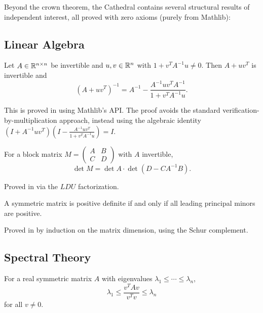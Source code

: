 \documentclass[11pt,a4paper]{article}
\begin{document}
Beyond the crown theorem, the Cathedral contains several structural
results of independent interest, all proved with zero axioms
(purely from Mathlib):

\subsection{Linear Algebra}

\begin{theorem}
\label{thm:sm}
Let $A \in \mathbb{R}^{n \times n}$ be invertible and $u, v \in \mathbb{R}^n$ with
$1 + v^T A^{-1} u \neq 0$. Then $A + uv^T$ is invertible and
\[
  (A + uv^T)^{-1} = A^{-1} - \frac{A^{-1}uv^TA^{-1}}{1 + v^TA^{-1}u}.
\]
\end{theorem}

This is proved in  using
Mathlib's  API. The proof avoids the standard
verification-by-multiplication approach, instead using the algebraic
identity $(I + A^{-1}uv^T)(I - \frac{A^{-1}uv^T}{1+v^TA^{-1}u}) = I$.

\begin{theorem}
\label{thm:schur}
For a block matrix $M = \begin{pmatrix} A & B \\ C & D \end{pmatrix}$
with $A$ invertible,
\[
  \det M = \det A \cdot \det(D - CA^{-1}B).
\]
\end{theorem}

Proved in  via the
$LDU$ factorization.

\begin{theorem}
\label{thm:sylvester}
A symmetric matrix is positive definite if and only if all leading
principal minors are positive.
\end{theorem}

Proved in  by induction on the
matrix dimension, using the Schur complement.

\subsection{Spectral Theory}

\begin{theorem}
\label{thm:rayleigh}
For a real symmetric matrix $A$ with eigenvalues $\lambda_1 \leq \cdots \leq \lambda_n$,
\[
  \lambda_1 \leq \frac{v^T A v}{v^T v} \leq \lambda_n
\]
for all $v \neq 0$.
\end{theorem}
\end{document}
